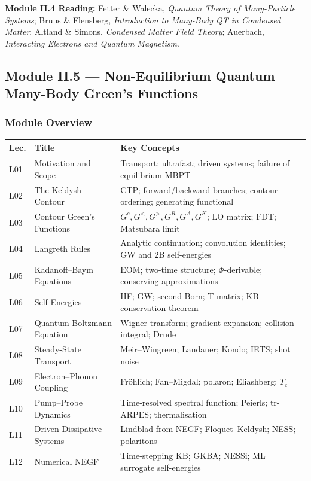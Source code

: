 \documentclass[11pt,a4paper]{article}
\begin{document}
\begin{tcolorbox}[highlightbox]
\textbf{Module II.4 Reading:} Fetter \& Walecka, \textit{Quantum Theory of Many-Particle Systems}; Bruus \& Flensberg, \textit{Introduction to Many-Body QT in Condensed Matter}; Altland \& Simons, \textit{Condensed Matter Field Theory}; Auerbach, \textit{Interacting Electrons and Quantum Magnetism}.
\end{tcolorbox}

\subsection{Module II.5 --- Non-Equilibrium Quantum Many-Body Green's Functions}
\label{sec:mod-II5}

\subsubsection*{Module Overview}

{\footnotesize
\begin{center}
\begin{tabular}{@{}lp{4.2cm}p{6.8cm}@{}}
\toprule
\textbf{Lec.} & \textbf{Title} & \textbf{Key Concepts}\\
\midrule
L01 & Motivation and Scope & Transport; ultrafast; driven systems; failure of equilibrium MBPT\\
L02 & The Keldysh Contour & CTP; forward/backward branches; contour ordering; generating functional\\
L03 & Contour Green's Functions & $G^c,G^<,G^>,G^R,G^A,G^K$; LO matrix; FDT; Matsubara limit\\
L04 & Langreth Rules & Analytic continuation; convolution identities; GW and 2B self-energies\\
L05 & Kadanoff--Baym Equations & EOM; two-time structure; $\Phi$-derivable; conserving approximations\\
L06 & Self-Energies & HF; GW; second Born; T-matrix; KB conservation theorem\\
\midrule
L07 & Quantum Boltzmann Equation & Wigner transform; gradient expansion; collision integral; Drude\\
L08 & Steady-State Transport & Meir--Wingreen; Landauer; Kondo; IETS; shot noise\\
L09 & Electron--Phonon Coupling & Fr\"ohlich; Fan--Migdal; polaron; Eliashberg; $T_c$\\
L10 & Pump--Probe Dynamics & Time-resolved spectral function; Peierls; tr-ARPES; thermalisation\\
L11 & Driven-Dissipative Systems & Lindblad from NEGF; Floquet--Keldysh; NESS; polaritons\\
L12 & Numerical NEGF & Time-stepping KB; GKBA; NESSi; ML surrogate self-energies\\
\bottomrule
\end{tabular}
\end{center}
}
\end{document}
